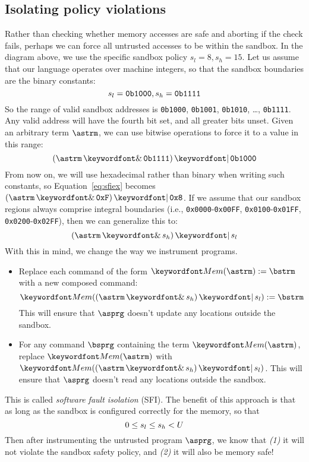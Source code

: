 \documentclass[11pt,twoside]{scrartcl}
\begin{document}
\subsection{Isolating policy violations}
Rather than checking whether memory accesses are safe and aborting if the check fails, perhaps we can force all untrusted accesses to be within the sandbox. In the diagram above, we use the specific sandbox policy $s_l=8, s_h=15$. Let us assume that our language operates over machine integers, so that the sandbox boundaries are the binary constants:
\[
s_l = \verb'0b1000', s_h = \verb'0b1111'
\]
So the range of valid sandbox addresses is \verb'0b1000', \verb'0b1001', \verb'0b1010', \ldots, \verb'0b1111'. Any valid address will have the fourth bit set, and all greater bits unset. Given an arbitrary term $\astrm$, we can use bitwise operations to force it to a value in this range:
\begin{equation}
\label{eq:sfiex}
(\astrm \bitand \verb'0b1111') \bitor \verb'0b1000'
\end{equation}
From now on, we will use hexadecimal rather than binary when writing such constants, so Equation~\ref{eq:sfiex} becomes $(\astrm \bitand \verb'0xF') \bitor \verb'0x8'$. If we assume that our sandbox regions always comprise integral boundaries (i.e., \verb'0x0000'-\verb'0x00FF', \verb'0x0100'-\verb'0x01FF', \verb'0x0200'-\verb'0x02FF'), then we can generalize this to:
\begin{equation}
\label{eq:sfiex}
(\astrm \bitand s_h) \bitor s_l
\end{equation}
With this in mind, we change the way we instrument programs.
\begin{itemize}
  \item Replace each command of the form $\pderef{\astrm}:=\bstrm$ with a new composed command:
  \[
  \pderef{(\astrm \bitand s_h) \bitor s_l}:=\bstrm
  \]
  This will ensure that $\asprg$ doesn't update any locations outside the sandbox.

  \item For any command $\bsprg$ containing the term $\pderef{\astrm}$, replace $\pderef{\astrm}$ with $\pderef{(\astrm \bitand s_h) \bitor s_l}$.
  This will ensure that $\asprg$ doesn't read any locations outside the sandbox.
\end{itemize}
This is called \emph{software fault isolation} (SFI).
The benefit of this approach is that as long as the sandbox is configured correctly for the memory, so that
\begin{equation}
0 \le s_l \le s_h < U
\end{equation}
Then after instrumenting the untrusted program $\asprg$, we know that \emph{(1)} it will not violate the sandbox safety policy, and \emph{(2)} it will also be memory safe! 
\end{document}
